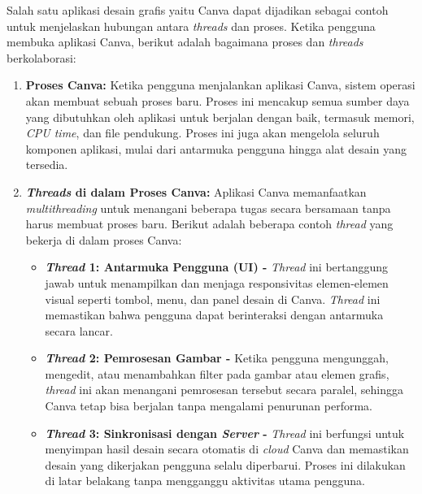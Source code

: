 \documentclass[12pt]{article}
\begin{document}
\hspace{1cm}

Salah satu aplikasi desain grafis yaitu Canva dapat dijadikan sebagai contoh untuk menjelaskan hubungan antara \textit{threads} dan proses. Ketika pengguna membuka aplikasi Canva, berikut adalah bagaimana proses dan \textit{threads} berkolaborasi:

\begin{enumerate}
    \item \textbf{Proses Canva:} Ketika pengguna menjalankan aplikasi Canva, sistem operasi akan membuat sebuah proses baru. Proses ini mencakup semua sumber daya yang dibutuhkan oleh aplikasi untuk berjalan dengan baik, termasuk memori, \textit{CPU time}, dan file pendukung. Proses ini juga akan mengelola seluruh komponen aplikasi, mulai dari antarmuka pengguna hingga alat desain yang tersedia.
    
    \item \textbf{\textit{Threads} di dalam Proses Canva:} Aplikasi Canva memanfaatkan \textit{multithreading} untuk menangani beberapa tugas secara bersamaan tanpa harus membuat proses baru. Berikut adalah beberapa contoh \textit{thread} yang bekerja di dalam proses Canva:
    
    \begin{itemize}
        \item \textbf{\textit{Thread} 1: Antarmuka Pengguna (UI) -} \textit{Thread} ini bertanggung jawab untuk menampilkan dan menjaga responsivitas elemen-elemen visual seperti tombol, menu, dan panel desain di Canva. \textit{Thread} ini memastikan bahwa pengguna dapat berinteraksi dengan antarmuka secara lancar.
        \item \textbf{\textit{Thread} 2: Pemrosesan Gambar -} Ketika pengguna mengunggah, mengedit, atau menambahkan filter pada gambar atau elemen grafis, \textit{thread} ini akan menangani pemrosesan tersebut secara paralel, sehingga Canva tetap bisa berjalan tanpa mengalami penurunan performa.
        \item \textbf{\textit{Thread} 3: Sinkronisasi dengan \textit{Server} -} \textit{Thread} ini berfungsi untuk menyimpan hasil desain secara otomatis di \textit{cloud} Canva dan memastikan desain yang dikerjakan pengguna selalu diperbarui. Proses ini dilakukan di latar belakang tanpa mengganggu aktivitas utama pengguna.
    \end{itemize}


\end{enumerate}
\end{document}
